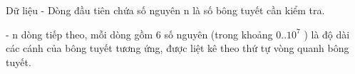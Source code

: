 Dữ liệu
- Dòng đầu tiên chứa số nguyên n là số bông tuyết cần kiểm tra.   


   - n dòng tiếp theo, mỗi dòng gồm 6 số nguyên (trong khoảng 0..$10^{7}$   ) là độ dài các cánh của bông tuyết tương ứng, được liệt kê theo thứ tự vòng quanh bông tuyết.